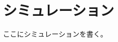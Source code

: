 \documentclass[12pt,a4paper,oneside,onecolumn,fleqn,dvipdfmx]{jreport}
\begin{document}
    \chapter{シミュレーション}
        ここにシミュレーションを書く。
\end{document}
